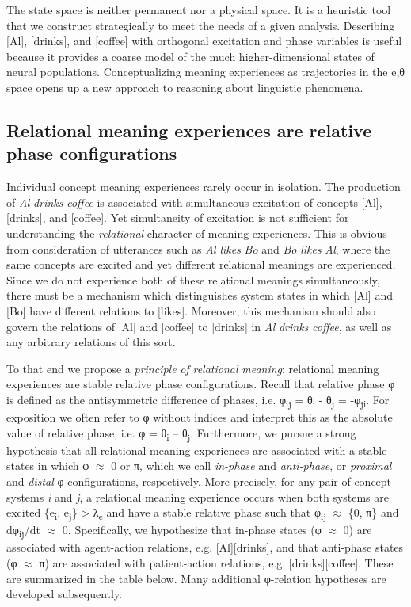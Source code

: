   The state space is neither permanent nor a physical space. It is a heuristic tool that we construct strategically to meet the needs of a given analysis. Describing [Al], [drinks], and [coffee] with orthogonal excitation and phase variables is useful because it provides a coarse model of the much higher-dimensional states of neural populations. Conceptualizing meaning experiences as trajectories in the e,θ space opens up a new approach to reasoning about linguistic phenomena.

\subsection{Relational meaning experiences are relative phase configurations}

Individual concept meaning experiences rarely occur in isolation. The production of \textit{Al} \textit{drinks} \textit{coffee} is associated with simultaneous excitation of concepts [Al], [drinks], and [coffee]. Yet simultaneity of excitation is not sufficient for understanding the \textit{relational} character of meaning experiences. This is obvious from consideration of utterances such as \textit{Al} \textit{likes} \textit{Bo} and \textit{Bo} \textit{likes} \textit{Al}, where the same concepts are excited and yet different relational meanings are experienced. Since we do not experience both of these relational meanings simultaneously, there must be a mechanism which distinguishes system states in which [Al] and [Bo] have different relations to [likes]. Moreover, this mechanism should also govern the relations of [Al] and [coffee] to [drinks] in \textit{Al} \textit{drinks} \textit{coffee}, as well as any arbitrary relations of this sort. 

  To that end we propose a \textit{principle} \textit{of} \textit{relational} \textit{meaning}: relational meaning experiences are stable relative phase configurations. Recall that relative phase φ is defined as the antisymmetric difference of phases, i.e. φ\textsubscript{ij} = θ\textsubscript{i} - θ\textsubscript{j} = -φ\textsubscript{ji}. For exposition we often refer to φ without indices and interpret this as the absolute value of relative phase, i.e. {\textbar}φ{\textbar} = {\textbar}θ\textsubscript{i} – θ\textsubscript{j}{\textbar}. Furthermore, we pursue a strong hypothesis that all relational meaning experiences are associated with a stable states in which φ ${\approx}$ 0 or π, which we call \textit{in-phase} and \textit{anti-phase}, or \textit{proximal} and \textit{distal} φ configurations, respectively. More precisely, for any pair of concept systems \textit{i} and \textit{j}, a relational meaning experience occurs when both systems are excited \{e\textsubscript{i}, e\textsubscript{j}\} > λ\textsubscript{e} and have a stable relative phase such that {\textbar}φ\textsubscript{ij}{\textbar} ${\approx}$ \{0, π\} and dφ\textsubscript{ij}/dt ${\approx}$ 0. Specifically, we hypothesize that in-phase states (φ ${\approx}$ 0) are associated with agent-action relations, e.g. [Al][drinks], and that anti-phase states (φ ${\approx}$ π) are associated with patient-action relations, e.g. [drinks][coffee]. These are summarized in the table below. Many additional φ-relation hypotheses are developed subsequently.

